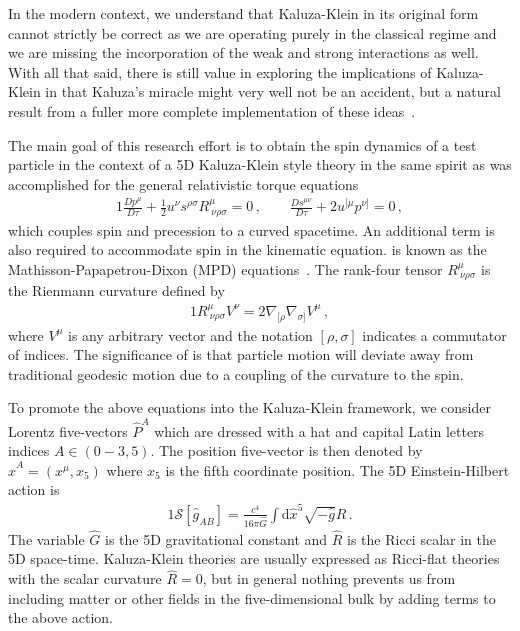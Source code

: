In the modern context, we understand that Kaluza-Klein in its original form cannot strictly be correct as we are operating purely in the classical regime and we are missing the incorporation of the weak and strong interactions as well. With all that said, there is still value in exploring the implications of Kaluza-Klein in that Kaluza's miracle might very well not be an accident, but a natural result from a fuller more complete implementation of these ideas~\citep{Overduin:1997sri}.

The main goal of this research effort is to obtain the spin dynamics of a test particle in the context of a 5D Kaluza-Klein style theory in the same spirit as was accomplished for the general relativistic torque equations
\begin{alignat}{1}
  \label{STRESS06} \frac{Dp^{\mu}}{D\tau}+\frac{1}{2}u^{\nu}s^{\rho\sigma}R^{\mu}_{\ \nu\rho\sigma}=0\,,\qquad
  \frac{Ds^{\mu\nu}}{D\tau}+2u^{[\mu}p^{\nu]}=0\,,
\end{alignat}
which couples spin and precession to a curved spacetime. An additional term is also required to accommodate spin in the kinematic equation.  is known as the Mathisson-Papapetrou-Dixon (MPD) equations~\citep{mathisson1937neue,Papapetrou:1951pa,Dixon:1970zza}. The rank-four tensor $R^{\mu}_{\ \nu\rho\sigma}$ is the Rienmann curvature defined by
\begin{alignat}{1}
  \label{STRESS08} R^{\mu}_{\ \nu\rho\sigma}V^{\nu}=2\nabla_{[\rho}\nabla_{\sigma]}V^{\mu}\,,
\end{alignat}
where $V^{\mu}$ is any arbitrary vector and the notation $[\rho,\sigma]$ indicates a commutator of indices. The significance of  is that particle motion will deviate away from traditional geodesic motion due to a coupling of the curvature to the spin.

To promote the above equations into the Kaluza-Klein framework, we consider Lorentz five-vectors $\hat{P}^{A}$ which are dressed with a hat and capital Latin letters indices $A\in(0-3,5)$. The position five-vector is then denoted by $\hat{x}^{A}=(x^{\mu},x_{5})$ where $x_{5}$ is the fifth coordinate position. The 5D Einstein-Hilbert action is
\begin{alignat}{1}
	\label{KALUZA01} \mathcal{S}[\hat{g}_{AB}]=\frac{c^{4}}{16\pi\hat{G}}\int\mathrm{d}\hat{x}^{5}\sqrt{-\hat{g}}\hat{R}\,.
\end{alignat}
The variable $\hat{G}$ is the 5D gravitational constant and $\hat{R}$ is the Ricci scalar in the 5D space-time. Kaluza-Klein theories are usually expressed as Ricci-flat theories with the scalar curvature $\hat{R}=0$, but in general nothing prevents us from including matter or other fields in the five-dimensional bulk by adding terms to the above action.

